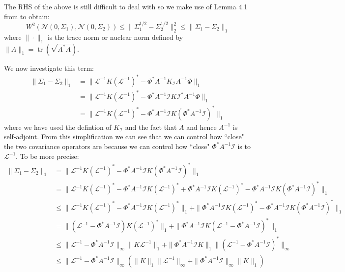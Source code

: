 The RHS of the above is still difficult to deal with so we make use of Lemma 4.1 from \textcolor{blue}{\citep{powers1970free}} to obtain:
\begin{equation}
    W^2(\mathcal{N}(0,\Sigma_1),\mathcal{N}(0,\Sigma_2))\leq\|\Sigma_{1}^{1/2}-\Sigma_{2}^{1/2}\|_{2}^{2}\leq\|\Sigma_1-\Sigma_2\|_{1}
\end{equation}
where $\|\cdot\|_1$ is the trace norm or nuclear norm defined by $\|A\|_{1}=\operatorname{tr}(\sqrt{A^{*}A})$.

We now investigate this term:
\begin{align*}
    \|\Sigma_{1}-\Sigma_2\|_{1}&=\|\mathcal{L}^{-1}K(\mathcal{L}^{-1})^{*}-\Phi^{*}A^{-1}K_{\mathcal{I}}A^{-1}\Phi\|_{1} \\
    &=\|\mathcal{L}^{-1}K(\mathcal{L}^{-1})^{*}-\Phi^{*}A^{-1}\mathcal{I}K\mathcal{I}^{*}A^{-1}\Phi\|_{1} \\
    &=\|\mathcal{L}^{-1}K(\mathcal{L}^{-1})^{*}-\Phi^{*}A^{-1}\mathcal{I}K(\Phi^{*}A^{-1}\mathcal{I})^{*}\|_{1}
\end{align*}
where we have used the defintion of $K_{\mathcal{I}}$ and the fact that $A$ and hence $A^{-1}$ is self-adjoint. From this simplification we can see that we can control how ``close" the two covariance operators are because we can control how ``close" $\Phi^{*}A^{-1}\mathcal{I}$ is to $\mathcal{L}^{-1}$. To be more precise:
\begin{align*}
    \|\Sigma_{1}-\Sigma_{2}\|_{1}&=\|\mathcal{L}^{-1}K(\mathcal{L}^{-1})^{*}-\Phi^{*}A^{-1}\mathcal{I}K(\Phi^{*}A^{-1}\mathcal{I})^{*}\|_{1} \\
    &=\|\mathcal{L}^{-1}K(\mathcal{L}^{-1})^{*}-\Phi^{*}A^{-1}\mathcal{I}K(\mathcal{L}^{-1})^{*}+\Phi^{*}A^{-1}\mathcal{I}K(\mathcal{L}^{-1})^{*}-\Phi^{*}A^{-1}\mathcal{I}K(\Phi^{*}A^{-1}\mathcal{I})^{*}\|_{1} \\
    &\leq\|\mathcal{L}^{-1}K(\mathcal{L}^{-1})^{*}-\Phi^{*}A^{-1}\mathcal{I}K(\mathcal{L}^{-1})^{*}\|_{1} + \|\Phi^{*}A^{-1}\mathcal{I}K(\mathcal{L}^{-1})^{*}-\Phi^{*}A^{-1}\mathcal{I}K(\Phi^{*}A^{-1}\mathcal{I})^{*}\|_{1} \\
    &= \|(\mathcal{L}^{-1}-\Phi^{*}A^{-1}\mathcal{I})K(\mathcal{L}^{-1})^{*}\|_{1} + \|\Phi^{*}A^{-1}\mathcal{I}K(\mathcal{L}^{-1}-\Phi^{*}A^{-1}\mathcal{I})^{*}\|_{1} \\
    &\leq\|\mathcal{L}^{-1}-\Phi^{*}A^{-1}\mathcal{I}\|_{\infty}\|K\mathcal{L}^{-1}\|_{1}+\|\Phi^{*}A^{-1}\mathcal{I}K\|_{1}\|(\mathcal{L}^{-1}-\Phi^{*}A^{-1}\mathcal{I})^{*}\|_{\infty} \\
    &\leq\|\mathcal{L}^{-1}-\Phi^{*}A^{-1}\mathcal{I}\|_{\infty}(\|K\|_{1}\|\mathcal{L}^{-1}\|_{\infty}+\|\Phi^{*}A^{-1}\mathcal{I}\|_{\infty}\|K\|_{1})
\end{align*}
